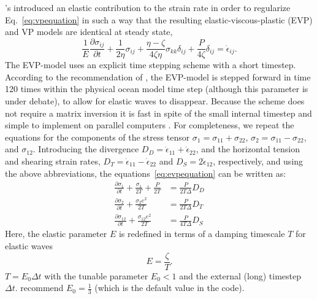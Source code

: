 \citet{hun97}'s introduced an elastic contribution to the strain
rate in order to regularize Eq.~\ref{eq:vpequation} in such a way that
the resulting elastic-viscous-plastic (EVP) and VP models are
identical at steady state,
\begin{equation}
  \label{eq:evpequation}
  \frac{1}{E}\frac{\partial\sigma_{ij}}{\partial{t}} +
  \frac{1}{2\eta}\sigma_{ij} 
  + \frac{\eta - \zeta}{4\zeta\eta}\sigma_{kk}\delta_{ij}  
  + \frac{P}{4\zeta}\delta_{ij}
  = \dot{\epsilon}_{ij}. 
\end{equation}
The EVP-model uses an explicit time stepping scheme with a short
timestep. According to the recommendation of \citet{hun97}, the
EVP-model is stepped forward in time 120 times within the physical
ocean model time step (although this parameter is under debate), to
allow for elastic waves to disappear.  Because the scheme does not
require a matrix inversion it is fast in spite of the small internal
timestep and simple to implement on parallel computers
\citep{hun97}. For completeness, we repeat the equations for the
components of the stress tensor $\sigma_{1} =
\sigma_{11}+\sigma_{22}$, $\sigma_{2}= \sigma_{11}-\sigma_{22}$, and
$\sigma_{12}$. Introducing the divergence $D_D =
\dot{\epsilon}_{11}+\dot{\epsilon}_{22}$, and the horizontal tension
and shearing strain rates, $D_T =
\dot{\epsilon}_{11}-\dot{\epsilon}_{22}$ and $D_S =
2\dot{\epsilon}_{12}$, respectively, and using the above
abbreviations, the equations~\ref{eq:evpequation} can be written as:
\begin{align}
  \label{eq:evpstresstensor1}
  \frac{\partial\sigma_{1}}{\partial{t}} + \frac{\sigma_{1}}{2T} +
  \frac{P}{2T} &= \frac{P}{2T\Delta} D_D \\
  \label{eq:evpstresstensor2}
  \frac{\partial\sigma_{2}}{\partial{t}} + \frac{\sigma_{2} e^{2}}{2T}
  &= \frac{P}{2T\Delta} D_T \\
  \label{eq:evpstresstensor12}
  \frac{\partial\sigma_{12}}{\partial{t}} + \frac{\sigma_{12} e^{2}}{2T}
  &= \frac{P}{4T\Delta} D_S 
\end{align}
Here, the elastic parameter $E$ is redefined in terms of a damping timescale
$T$ for elastic waves \[E=\frac{\zeta}{T}.\]
$T=E_{0}\Delta{t}$ with the tunable parameter $E_0<1$ and
the external (long) timestep $\Delta{t}$. \citet{hun97} recommend
$E_{0} = \frac{1}{3}$ (which is the default value in the code).

